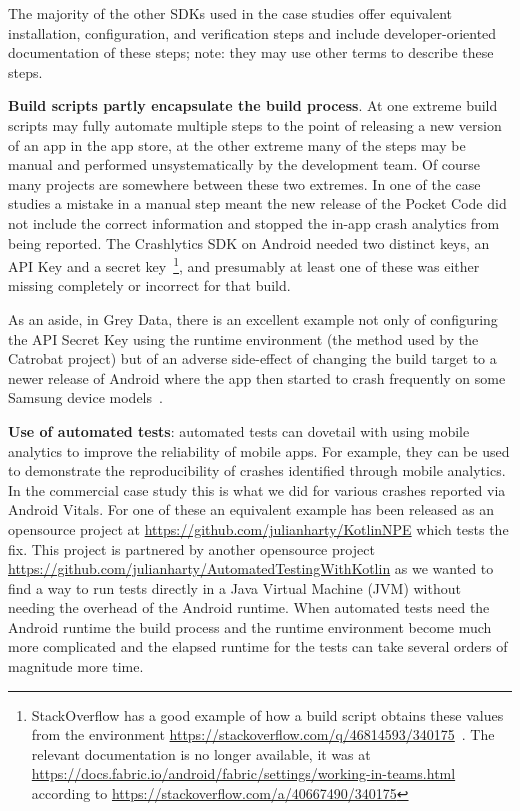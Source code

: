 The majority of the other SDKs used in the case studies offer equivalent installation, configuration, and verification steps and include developer-oriented documentation of these steps; note: they may use other terms to describe these steps.

\textbf{Build scripts partly encapsulate the build process}.  
At one extreme build scripts may fully automate multiple steps to the point of releasing a new version of an app in the app store, at the other extreme many of the steps may be manual and performed unsystematically by the development team. Of course many projects are somewhere between these two extremes. In one of the case studies a mistake in a manual step meant the new release of the Pocket Code did not include the correct information and stopped the in-app crash analytics from being reported. The Crashlytics SDK on Android needed two distinct keys, an API Key and a secret key~\footnote{StackOverflow has a good example of how a build script obtains these values from the environment \url{https://stackoverflow.com/q/46814593/340175}~\citep{scott2017_android_app_crash_noclassdeffounderror_on_samsung_lollipop_devices}. The relevant documentation is no longer available, it was at \url{https://docs.fabric.io/android/fabric/settings/working-in-teams.html} according to \url{https://stackoverflow.com/a/40667490/340175}}, and presumably at least one of these was either missing completely or incorrect for that build.

As an aside, in Grey Data, there is an excellent example not only of configuring the API Secret Key using the runtime environment (the method used by the Catrobat project) but of an adverse side-effect of changing the build target to a newer release of Android where the app then started to crash frequently on some Samsung device models~\citep{scott2017_android_app_crash_noclassdeffounderror_on_samsung_lollipop_devices}. 

\textbf{Use of automated tests}: automated tests can dovetail with using mobile analytics to improve the reliability of mobile apps. For example, they can be used to demonstrate the reproducibility of crashes identified through mobile analytics. In the commercial case study this is what we did for various crashes reported via Android Vitals. For one of these an equivalent example has been released as an opensource project at \url{https://github.com/julianharty/KotlinNPE} which tests the fix. This project is partnered by another opensource project \url{https://github.com/julianharty/AutomatedTestingWithKotlin} as we wanted to find a way to run tests directly in a Java Virtual Machine (JVM) without needing the overhead of the Android runtime. When automated tests need the Android runtime the build process and the runtime environment become much more complicated and the elapsed runtime for the tests can take several orders of magnitude more time.


